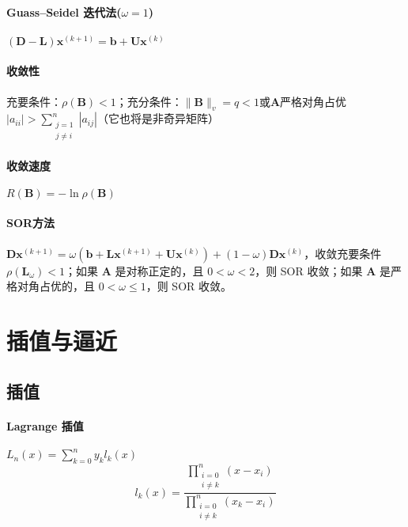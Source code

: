 \documentclass[twocolumn]{ctexart}
\begin{document}
\paragraph{Guass--Seidel 迭代法($\omega=1$)} $(\mathbf{D}-\mathbf{L})\mathbf{x}^{(k+1)}=\mathbf{b}+\mathbf{U}\mathbf{x}^{(k)}$

\paragraph{收敛性} 充要条件：$\rho(\mathbf{B})<1$；充分条件：$\lVert\mathbf{B}\rVert_v=q<1$或$\mathbf{A}$严格对角占优 $|a_{ii}|>\sum_{\substack{j=1\\j\neq i}}^n|a_{ij}|$（它也将是非奇异矩阵）

\paragraph{收敛速度} $R(\mathbf{B})=-\ln\rho(\mathbf{B})$

\paragraph{SOR方法} $\mathbf{D}\mathbf{x}^{(k+1)}=\omega(\mathbf{b}+\mathbf{L}\mathbf{x}^{(k+1)}+\mathbf{U}\mathbf{x}^{(k)})+(1-\omega)\mathbf{D}\mathbf{x}^{(k)}$，收敛充要条件 $\rho(\mathbf{L}_\omega)<1$；如果 $\mathbf{A}$ 是对称正定的，且 $0<\omega<2$，则 SOR 收敛；如果 $\mathbf{A}$ 是严格对角占优的，且 $0<\omega\leq 1$，则 SOR 收敛。


\section{插值与逼近}

\subsection{插值}

\paragraph{Lagrange 插值} $L_n(x)=\sum_{k=0}^ny_kl_k(x)$
\begin{equation*}
    l_k(x)=\frac{\prod_{\substack{i=0\\ i\neq k}}^n (x-x_i)}{\prod_{\substack{i=0\\ i\neq k}}^n(x_k-x_i)}
\end{equation*}
\end{document}
